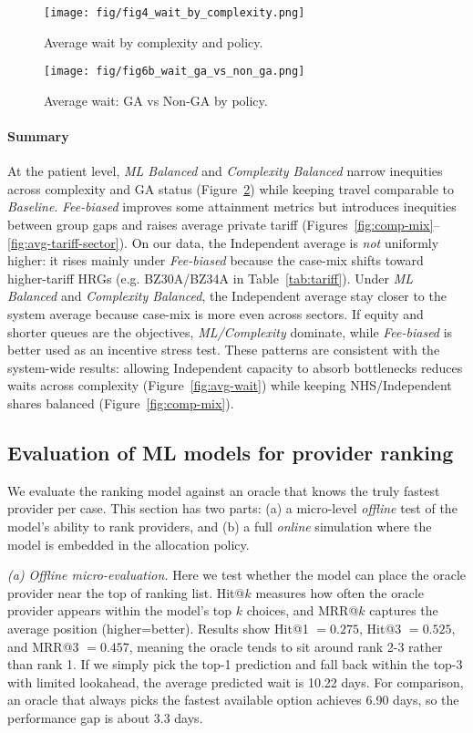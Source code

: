 \documentclass[ %
                    author={Nattanan Nawakitbamrung},
                supervisor={Dr. Sébastien Rochat},
                    degree={MSc},
                     title={Developing and Evaluating the Impact of a Single Patient Treatment List (PTL) for an NHS Integrated Care System},
                  subtitle={},
                      type={},
                      year={2025}]{dissertation}
\begin{document}
\begin{figure}[htbp]
\centering
\texttt{[image: fig/fig4\_wait\_by\_complexity.png]}
\caption{Average wait by complexity and policy.}
\label{fig:avg-wait-by-comp}
\end{figure}

\begin{figure}[htbp]
\centering
\texttt{[image: fig/fig6b\_wait\_ga\_vs\_non\_ga.png]}
\caption{Average wait: GA vs Non-GA by policy.}
\label{fig:ga-non-ga}
\end{figure}

\paragraph{Summary}
At the patient level, \textit{ML Balanced} and \textit{Complexity Balanced} narrow inequities across complexity and GA status (Figure~\ref{fig:ga-non-ga}) while keeping travel comparable to \textit{Baseline}. \textit{Fee-biased} improves some attainment metrics but introduces inequities between group gaps and raises average private tariff (Figures~\ref{fig:comp-mix}–\ref{fig:avg-tariff-sector}). On our data, the Independent average is \emph{not} uniformly higher: it rises mainly under \textit{Fee-biased} because the case-mix shifts toward higher-tariff HRGs (e.g. BZ30A/BZ34A in Table~\ref{tab:tariff}). Under \textit{ML Balanced} and \textit{Complexity Balanced}, the Independent average stay closer to the system average because case-mix is more even across sectors. If equity and shorter queues are the objectives, \textit{ML/Complexity} dominate, while \textit{Fee-biased} is better used as an incentive stress test. These patterns are consistent with the system-wide results: allowing Independent capacity to absorb bottlenecks reduces waits across complexity (Figure~\ref{fig:avg-wait}) while keeping NHS/Independent shares balanced (Figure~\ref{fig:comp-mix}).


\subsection{Evaluation of ML models for provider ranking}
We evaluate the ranking model against an oracle that knows the truly fastest provider per case. This section has two parts: (a) a micro-level \emph{offline} test of the model's ability to rank providers, and (b) a full \emph{online} simulation where the model is embedded in the allocation policy.

\emph{(a) Offline micro-evaluation.} 
Here we test whether the model can place the oracle provider near the top of ranking list. Hit@$k$ measures how often the oracle provider appears within the model's top $k$ choices, and MRR@$k$ captures the average position (higher=better). Results show Hit@1 $=0.275$, Hit@3 $=0.525$, and MRR@3 $=0.457$, meaning the oracle tends to sit around rank 2-3 rather than rank 1. If we simply pick the top-1 prediction and fall back within the top-3 with limited lookahead, the average predicted wait is 10.22 days. For comparison, an oracle that always picks the fastest available option achieves 6.90 days, so the performance gap is about 3.3 days.
\end{document}
